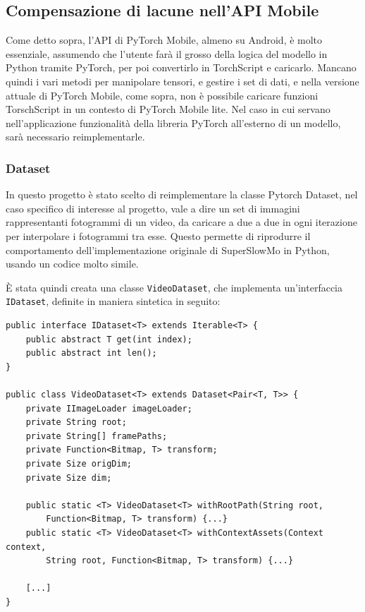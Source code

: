 \subsection{Compensazione di lacune nell'API Mobile}

Come detto sopra, l'API di PyTorch Mobile, almeno su Android, è molto essenziale, assumendo
che l'utente farà il grosso della logica del modello in Python tramite PyTorch, per poi
convertirlo in TorchScript e caricarlo. Mancano quindi i vari metodi per manipolare tensori,
e gestire i set di dati, e nella versione attuale di PyTorch Mobile, come sopra, non è possibile
caricare funzioni TorschScript in un contesto di PyTorch Mobile lite. Nel caso in cui servano 
nell'applicazione funzionalità della libreria PyTorch all'esterno di un modello, sarà necessario
reimplementarle.

\subsubsection*{Dataset}
\label{sec:dataset}

In questo progetto è stato scelto di reimplementare la classe Pytorch Dataset, 
nel caso specifico di interesse al progetto, vale a dire un set di immagini rappresentanti
fotogrammi di un video, da caricare a due a due in ogni iterazione per interpolare i fotogrammi
tra esse. Questo permette di riprodurre il comportamento dell'implementazione originale di
SuperSlowMo in Python, usando un codice molto simile.

È stata quindi creata una classe \texttt{VideoDataset}, che implementa un'interfaccia 
\texttt{IDataset}, definite in maniera sintetica in seguito:

\begin{lstlisting}
public interface IDataset<T> extends Iterable<T> {
    public abstract T get(int index);
    public abstract int len();
}

public class VideoDataset<T> extends Dataset<Pair<T, T>> {
    private IImageLoader imageLoader;
    private String root;
    private String[] framePaths;
    private Function<Bitmap, T> transform;
    private Size origDim;
    private Size dim;

    public static <T> VideoDataset<T> withRootPath(String root, 
        Function<Bitmap, T> transform) {...}
    public static <T> VideoDataset<T> withContextAssets(Context context, 
        String root, Function<Bitmap, T> transform) {...}

    [...]
}
\end{lstlisting}


